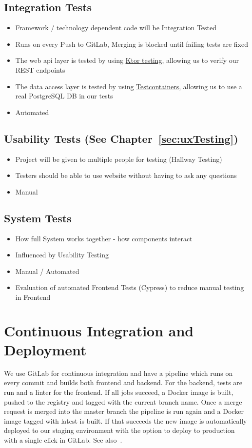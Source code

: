 \subsection{Integration Tests}
\begin{itemize}
    \item Framework / technology dependent code will be Integration Tested
    \item Runs on every Push to GitLab, Merging is blocked until failing tests are fixed
    \item The web api layer is tested by using \hyperlink{https://ktor.io/docs/testing.html}{Ktor testing}, allowing us to verify our REST endpoints
    \item The data access layer is tested by using \hyperlink{https://www.testcontainers.org/}{Testcontainers}, allowing us to use a real PostgreSQL DB in our tests
    \item Automated
\end{itemize}

\subsection{Usability Tests (See Chapter~\ref{sec:uxTesting})}
\begin{itemize}
    \item Project will be given to multiple people for testing (Hallway Testing)
    \item Testers should be able to use website without having to ask any questions
    \item Manual
\end{itemize}

\subsection{System Tests}
\begin{itemize}
    \item How full System works together - how components interact
    \item Influenced by Usability Testing
    \item Manual / Automated
    \item Evaluation of automated Frontend Tests (Cypress) to reduce manual testing in Frontend
\end{itemize}

\section{Continuous Integration and Deployment}
We use GitLab for continuous integration and have a pipeline which runs on every commit and builds both frontend and backend.
For the backend, tests are run and a linter for the frontend.
If all jobs succeed, a Docker image is built, pushed to the registry and tagged with the current branch name.
Once a merge request is merged into the master branch the pipeline is run again and a Docker image tagged with latest is built.
If that succeeds the new image is automatically deployed to our staging environment with the option to deploy to production with a single click in GitLab.
See also~.

